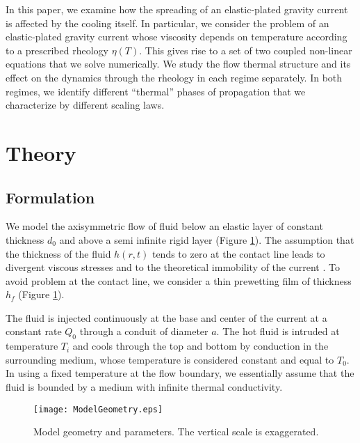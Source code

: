 In  this paper,  we examine  how  the spreading  of an  elastic-plated
gravity current is affected by  the cooling itself.  In particular, we
consider  the  problem  of  an elastic-plated  gravity  current  whose
viscosity depends  on temperature  according to a  prescribed rheology
$\eta(T)$.   This  gives rise  to  a  set  of two  coupled  non-linear
equations  that  we solve  numerically.   We  study the  flow  thermal
structure and its effect on the  dynamics through the rheology in each
regime separately.  In both regimes, we identify different ``thermal''
phases of propagation that we characterize by different scaling laws.

\section{Theory}
\label{C3-sec:theory}

\subsection{Formulation}
\label{C3-sec:formulation}

We model  the axisymmetric  flow of  fluid below  an elastic  layer of
constant thickness $d_0$ and above a semi infinite rigid layer (Figure
\ref{C3-Figure2-1}).  The  assumption that the thickness  of the fluid
$h(r,t)$ tends to zero at the  contact line leads to divergent viscous
stresses   and  to   the   theoretical  immobility   of  the   current
\citep{Flitton:1999iv}.   To avoid  problem  at the  contact line,  we
consider    a    thin    prewetting   film    of    thickness    $h_f$
\citep{Lister:2013ia} (Figure \ref{C3-Figure2-1}).

The  fluid is  injected continuously  at the  base and  center of  the
current  at  a constant  rate  $Q_0$  through  a conduit  of  diameter
$a$. The hot fluid is intruded  at temperature $T_i$ and cools through
the  top and  bottom by  conduction in  the surrounding  medium, whose
temperature is  considered constant  and equal to  $T_0$.  In  using a
fixed temperature at the flow boundary, we essentially assume that the
fluid is bounded by a medium with infinite thermal conductivity.

\begin{figure}[h!]
  \begin{center}
    \graphicspath{ {/Users/thorey/Documents/These/Manuscript/Figure/Chapter3/} }
    \texttt{[image: ModelGeometry.eps]}
    \caption{Model  geometry and  parameters.  The  vertical scale  is
      exaggerated.}
    \label{C3-Figure2-1}
  \end{center}
\end{figure}

